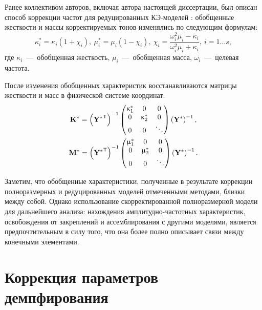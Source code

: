 Ранее коллективом авторов, включая автора настоящей диссертации, был описан способ коррекции частот для редуцированных КЭ-моделей \cite{lib:author:reducedUpdating}: обобщенные жесткости и массы корректируемых тонов изменялись по следующим формулам:
\begin{equation}
	\kappa_i ^ * = \kappa_i (1 + \chi_i), \ \mu_i ^ * = \mu_i (1 - \chi_i), \ \chi_i = \frac{\omega_i ^ 2 \mu_i - \kappa_i}{\omega_i ^ 2 \mu_i + \kappa_i}, \ i = 1 \hdots s, \label{eq:reducedGenParametersUpdating}
\end{equation}
где $ \kappa_i $~---~обобщенная жесткость, $ \mu_i $~---~обобщенная масса, $ \omega_i $~---~целевая частота.

После изменения обобщенных характеристик восстанавливаются матрицы жесткости и масс в физической системе координат:
\begin{equation}
	\begin{gathered}
		\mathbf{K} ^ \ast = 
		\left( \mathbf{Y ^ \ast} ^ \mathsf{T} \right) ^ {-1} 
		\begin{pmatrix}
			\upkappa_1 ^ \ast & 0 & 0 \\
			0 & \upkappa_2 ^ \ast & 0 \\
			0 & 0 & \ddots
		\end{pmatrix} 
		\left( \mathbf{Y} ^ \ast \right) ^ {-1}, \\
		\mathbf{M} ^ \ast = 
		\left( \mathbf{Y ^ \ast} ^ \mathsf{T} \right) ^ {-1} 
		\begin{pmatrix}
			\upmu_1 ^ \ast & 0 & 0 \\
			0 & \upmu_2 ^ \ast & 0 \\
			0 & 0 & \ddots
		\end{pmatrix}
		\left( \mathbf{Y} ^ \ast \right) ^ {-1}.
	\end{gathered}
	\label{eq:reducedStructuralMatrices}
\end{equation}

Заметим, что обобщенные характеристики, полученные в результате коррекции полноразмерных и редуцированных моделей отмеченными методами, близки между собой. Однако использование скорректированной полноразмерной модели для дальнейшего анализа: нахождения амплитудно-частотных характеристик, освобождения от закреплений и ассемблирования с другими моделями, является предпочтительным в силу того, что она более полно описывает связи между конечными элементами.

\section{Коррекция параметров демпфирования}

